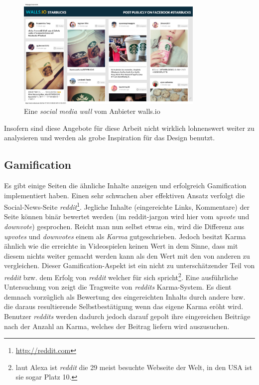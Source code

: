 \documentclass[12pt,twoside]{book}
\begin{document}
\begin{figure}[H]
    \centering
    \includegraphics[width=0.8\textwidth]{images/Starbucks.png}
    \caption{Eine \textit{social media wall} vom Anbieter walls.io}
    \label{fig:awesome_image}
\end{figure}

Insofern sind diese Angebote für diese Arbeit nicht wirklich lohnenswert weiter zu analysieren und werden als grobe Inspiration für das Design benutzt.

\subsection* {Gamification}

Es gibt einige Seiten die ähnliche Inhalte anzeigen und erfolgreich Gamification implementiert haben. Einen sehr schwachen aber effektiven Ansatz verfolgt die Social-News-Seite \textit{reddit}\footnote{\url{http://reddit.com}}. Jegliche Inhalte (eingereichte Links, Kommentare) der Seite können binär bewertet werden (im reddit-jargon wird hier vom \textit{upvote} und \textit{downvote}) gesprochen. Reicht man nun selbst etwas ein, wird die Differenz aus \textit{upvotes} und \textit{downvotes} einem als \textit{Karma} gutgeschrieben. Jedoch besitzt Karma ähnlich wie die erreichte in Videospielen keinen Wert in dem Sinne, dass mit diesem nichts weiter gemacht werden kann als den Wert mit den von anderen zu vergleichen.
Dieser Gamification-Aspekt ist ein nicht zu unterschätzender Teil von \textit{reddit} bzw. dem Erfolg von \textit{reddit} welcher für sich spricht\footnote{laut Alexa ist \textit{reddit} die 29 meist besuchte Webseite der Welt, in den USA ist sie sogar Platz 10.}.
Eine ausführliche Untersuchung von \citep{richterichkarma} zeigt die Tragweite von \textit{reddits} Karma-System. Es dient demnach vorzüglich als Bewertung des eingereichten Inhalts durch andere bzw. die daraus resultierende Selbstbestätigung wenn das eigene Karma eröht wird.
Benutzer \textit{reddits} werden dadurch jedoch darauf gepolt ihre eingereichen Beiträge nach der Anzahl an Karma, welches der Beitrag liefern wird auszusuchen.
\end{document}
